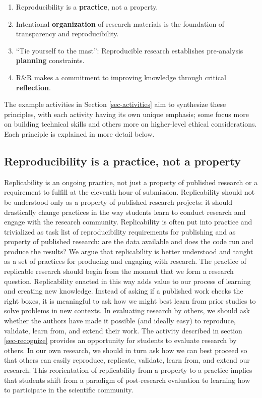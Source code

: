 \documentclass[
  12pt]{article}
\begin{document}
\begin{enumerate}
    \item Reproducibility is a \textbf{practice}, not a property.
    \item Intentional \textbf{organization} of research materials is the foundation of transparency and reproducibility.
    \item ``Tie yourself to the mast'': Reproducible research establishes pre-analysis \textbf{planning} constraints.
    \item R\&R makes a commitment to improving knowledge through critical \textbf{reflection}.
\end{enumerate}

\noindent The example activities in Section \ref{sec-activities} aim to synthesize these principles, with each activity having its own unique emphasis; some focus more on building technical skills and others more on higher-level ethical considerations.
Each principle is explained in more detail below. 

\subsection{Reproducibility is a \textbf{practice}, not a property}

Replicability is an ongoing practice, not just a property of published research or a requirement to fulfill at the eleventh hour of submission.
Replicability should not be understood only as a property of published research projects: it should drastically change practices in the way students learn to conduct research and engage with the research community. 
Replicability is often put into practice and trivialized as task list of reproducibility requirements for publishing and as property of published research: are the data available and does the code run and produce the results?
We argue that replicability is better understood and taught as a set of practices for producing and engaging with research.
The practice of replicable research should begin from the moment that we form a research question.
Replicability enacted in this way adds value to our process of learning and creating new knowledge. Instead of asking if a published work checks the right boxes, it is meaningful to ask how we might best learn from prior studies to solve problems in new contexts.
In evaluating research by others, we should ask whether the authors have made it possible (and ideally easy) to reproduce, validate, learn from, and extend their work.
The activity described in section \ref{sec-recognize} provides an opportunity for students to evaluate research by others.
In our own research, we should in turn ask how we can best proceed so that others can easily reproduce, replicate, validate, learn from, and extend our research.
This reorientation of replicability from a property to a practice implies that students shift from a paradigm of post-research evaluation to learning how to participate in the scientific community.
\end{document}
